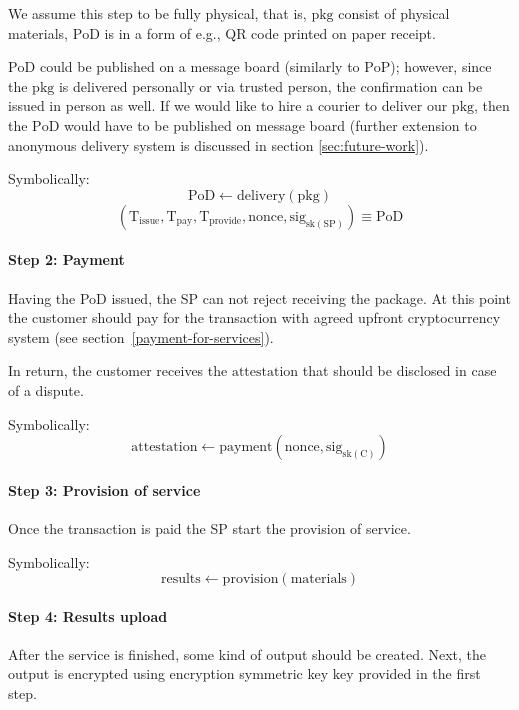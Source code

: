 \documentclass{ieeeaccess}
\begin{document}
We assume this step to be fully physical, that is, $\mathrm{pkg}$ consist of physical materials, $\mathrm{PoD}$ is in a form of e.g., QR code printed on paper receipt. 

$\mathrm{PoD}$ could be published on a message board (similarly to $\mathrm{PoP}$); however, since the $\mathrm{pkg}$ is delivered personally or via trusted person, the confirmation can be issued in person as well. If we would like to hire a courier to deliver our $\mathrm{pkg}$, then the $\mathrm{PoD}$ would have to be published on message board (further extension to anonymous delivery system is discussed in section \ref{sec:future-work}).

Symbolically: 
\[
\mathrm{PoD} \gets \mathrm{delivery}(\mathrm{pkg})
\]
\[
(\mathrm{T}_\mathrm{issue}, \mathrm{T}_\mathrm{pay}, \mathrm{T}_\mathrm{provide}, \mathrm{nonce}, \mathrm{sig}_{\mathrm{sk}(\mathrm{SP})}) \equiv \mathrm{PoD}
\]


\paragraph{Step 2: Payment}\label{step-2-payment}

Having the PoD issued, the SP can not reject receiving the package. At this point the
customer should pay for the transaction with agreed upfront cryptocurrency system (see section~\ref{payment-for-services}).

In return, the customer receives the $\mathrm{attestation}$ that should be disclosed in case of a dispute.

Symbolically: \[
\mathrm{attestation} \gets \mathrm{payment}(\mathrm{nonce}, \mathrm{sig}_{\mathrm{sk}(\mathrm{C})})
\]

\paragraph{Step 3: Provision of service}\label{step-3-provision-of-service} 
Once the transaction is paid the SP start the provision of service.

Symbolically: \[
\mathrm{results} \gets \mathrm{provision}(\mathrm{materials})
\]

\paragraph{Step 4: Results upload}\label{step-4-results-upload}

After the service is finished, some kind of output should be created. Next, the output is encrypted using encryption symmetric key $\mathrm{key}$ provided in the first step.
\end{document}
